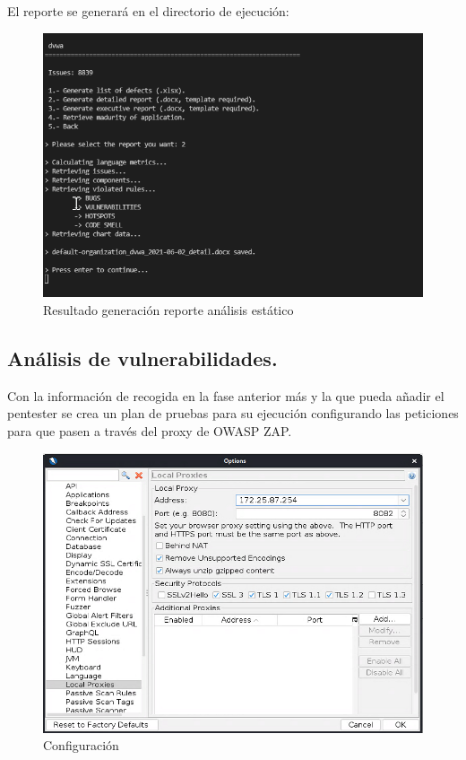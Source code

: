 El reporte se generará en el directorio de ejecución:

\begin{figure}[!htb] 
    \centering
    \captionsetup{width=1\linewidth}     
    \includegraphics[width=\linewidth]{./imagenes/017_SonarQubeReportTool_4.png}
    \caption{Resultado generación reporte análisis estático}  
    \label{fig:18}
\end{figure}

\newpage
\subsection{Análisis de vulnerabilidades.}
Con la información de recogida en la fase anterior más y la que pueda añadir el pentester se crea un plan de pruebas 
para su ejecución configurando las peticiones para que pasen a través del proxy de OWASP ZAP.

\begin{figure}[!htb]
    \centering
    \captionsetup{width=1\linewidth}  
    \includegraphics[scale=0.9]{./imagenes/031_OWASPZAP_LocalProxy.png}
    \caption{Configuración}  
    \label{fig:localProxyOWASPZap}
\end{figure}

